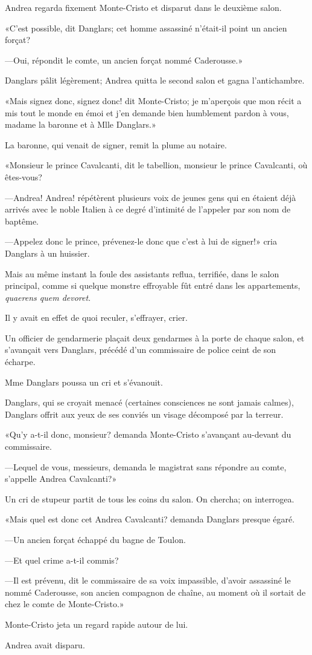 Andrea regarda fixement Monte-Cristo et disparut dans le deuxième salon. 

«C'est possible, dit Danglars; cet homme assassiné n'était-il point un ancien forçat? 

—Oui, répondit le comte, un ancien forçat nommé Caderousse.» 

Danglars pâlit légèrement; Andrea quitta le second salon et gagna l'antichambre. 

«Mais signez donc, signez donc! dit Monte-Cristo; je m'aperçois que mon récit a mis tout le monde en émoi et j'en demande bien humblement pardon à vous, madame la baronne et à Mlle Danglars.» 

La baronne, qui venait de signer, remit la plume au notaire. 

«Monsieur le prince Cavalcanti, dit le tabellion, monsieur le prince Cavalcanti, où êtes-vous? 

—Andrea! Andrea! répétèrent plusieurs voix de jeunes gens qui en étaient déjà arrivés avec le noble Italien à ce degré d'intimité de l'appeler par son nom de baptême. 

—Appelez donc le prince, prévenez-le donc que c'est à lui de signer!» cria Danglars à un huissier. 

Mais au même instant la foule des assistants reflua, terrifiée, dans le salon principal, comme si quelque monstre effroyable fût entré dans les appartements, \textit{quaerens quem devoret}. 

Il y avait en effet de quoi reculer, s'effrayer, crier. 

Un officier de gendarmerie plaçait deux gendarmes à la porte de chaque salon, et s'avançait vers Danglars, précédé d'un commissaire de police ceint de son écharpe. 

Mme Danglars poussa un cri et s'évanouit. 

Danglars, qui se croyait menacé (certaines consciences ne sont jamais calmes), Danglars offrit aux yeux de ses conviés un visage décomposé par la terreur. 

«Qu'y a-t-il donc, monsieur? demanda Monte-Cristo s'avançant au-devant du commissaire. 

—Lequel de vous, messieurs, demanda le magistrat sans répondre au comte, s'appelle Andrea Cavalcanti?» 

Un cri de stupeur partit de tous les coins du salon. On chercha; on interrogea. 

«Mais quel est donc cet Andrea Cavalcanti? demanda Danglars presque égaré. 

—Un ancien forçat échappé du bagne de Toulon. 

—Et quel crime a-t-il commis? 

—Il est prévenu, dit le commissaire de sa voix impassible, d'avoir assassiné le nommé Caderousse, son ancien compagnon de chaîne, au moment où il sortait de chez le comte de Monte-Cristo.» 

Monte-Cristo jeta un regard rapide autour de lui. 

Andrea avait disparu. 